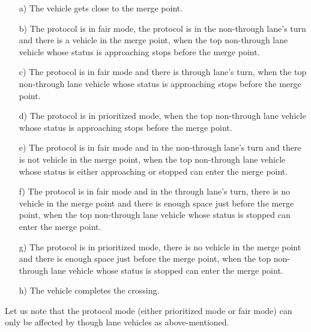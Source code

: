 \documentclass[10pt, conference, compsocconf]{IEEEtran}
\begin{document}
\begin{itemize}
  \item[a)] The vehicle gets close to the merge point. 
  \item[b)] The protocol is in fair mode, the protocol is in the non-through lane's turn and there is a vehicle in the merge point, when the top non-through lane vehicle whose status is approaching stops before the merge point.
  \item[c)] The protocol is in fair mode and there is through lane's turn, when the top non-through lane vehicle whose status is approaching stops before the merge point.
  \item[d)] The protocol is in prioritized mode, when the top non-through lane vehicle whose status is approaching stops before the merge point.
  \item[e)] The protocol is in fair mode and in the non-through lane's turn and there is not vehicle in the merge point, when the top non-through lane vehicle whose status is either approaching or stopped can enter the merge point.
  \item[f)] The protocol is in fair mode and in the through lane's turn, there is no vehicle in the merge point and there is enough space just before the merge point, when the top non-through lane vehicle whose status is stopped can enter the merge point.
  \item[g)] The protocol is in prioritized mode, there is no vehicle in the merge point and there is enough space just before the merge point, when the top non-through lane vehicle whose status is stopped can enter the merge point.
  \item[h)] The vehicle completes the crossing.
\end{itemize}

Let us note that the protocol mode (either prioritized mode or fair
mode) can only be affected by though lane vehicles as above-mentioned.

 
\end{document}
